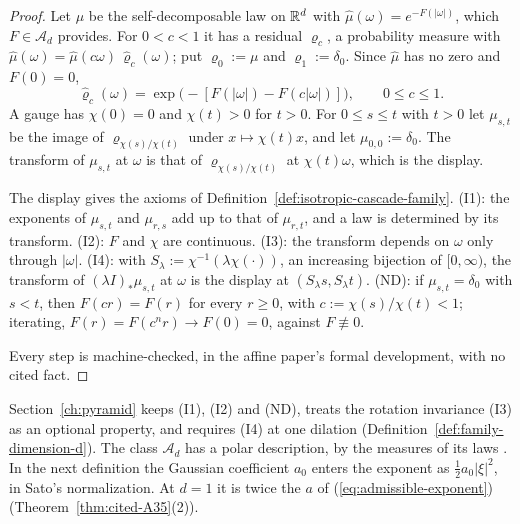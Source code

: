 \begin{proof}
Let $\mu$ be the self-decomposable law on $\mathbb{R}^d$ with $\widehat\mu(\omega) = e^{-F(|\omega|)}$,
which $F \in \mathcal{A}_d$ provides. For $0 < c < 1$ it has a residual $\varrho_c$, a probability
measure with $\widehat\mu(\omega) = \widehat\mu(c\omega)\,\widehat\varrho_c(\omega)$; put
$\varrho_0 := \mu$ and $\varrho_1 := \delta_0$. Since $\widehat\mu$ has no zero and $F(0) = 0$,
\[
  \widehat\varrho_c(\omega) = \exp\bigl(-[F(|\omega|) - F(c|\omega|)]\bigr), \qquad 0 \le c \le 1 .
\]
A gauge has $\chi(0) = 0$ and $\chi(t) > 0$ for $t > 0$. For $0 \le s \le t$ with $t > 0$ let
$\mu_{s,t}$ be the image of $\varrho_{\chi(s)/\chi(t)}$ under $x \mapsto \chi(t)x$, and let
$\mu_{0,0} := \delta_0$. The transform of $\mu_{s,t}$ at $\omega$ is that of $\varrho_{\chi(s)/\chi(t)}$
at $\chi(t)\omega$, which is the display.

The display gives the axioms of Definition~\ref{def:isotropic-cascade-family}. (I1): the exponents
of $\mu_{s,t}$ and $\mu_{r,s}$ add up to that of $\mu_{r,t}$, and a law is determined by its
transform. (I2): $F$ and $\chi$ are continuous. (I3): the transform depends on $\omega$ only through
$|\omega|$. (I4): with $S_\lambda := \chi^{-1}(\lambda\chi(\cdot))$, an increasing bijection of
$[0,\infty)$, the transform of $(\lambda I)_*\mu_{s,t}$ at $\omega$ is the display at
$(S_\lambda s, S_\lambda t)$. (ND): if $\mu_{s,t} = \delta_0$ with $s < t$, then $F(cr) = F(r)$ for
every $r \ge 0$, with $c := \chi(s)/\chi(t) < 1$; iterating, $F(r) = F(c^nr) \to F(0) = 0$, against
$F \not\equiv 0$.

Every step is machine-checked, in the affine paper's formal development, with no cited fact.
\end{proof}

Section~\ref{ch:pyramid} keeps (I1), (I2) and (ND), treats the rotation invariance (I3) as an
optional property, and requires (I4) at one dilation (Definition~\ref{def:family-dimension-d}). The class $\mathcal{A}_d$
has a polar description, by the \Levy{} measures of its laws . In the next definition the Gaussian coefficient $a_0$ enters the exponent as
$\tfrac12 a_0|\xi|^2$, in Sato's normalization. At $d = 1$ it is twice the $a$ of
(\ref{eq:admissible-exponent}) (Theorem~\ref{thm:cited-A35}(2)).

